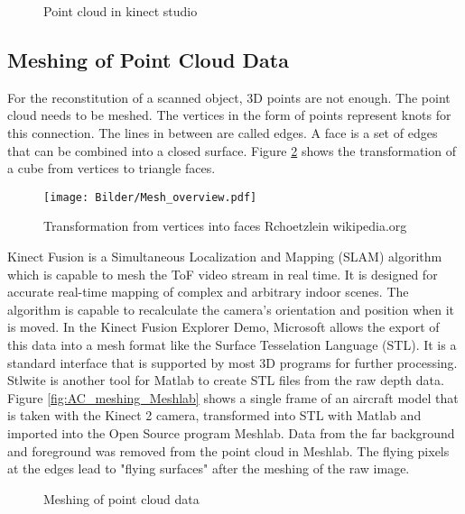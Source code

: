 \begin{figure}[!h]
	\centering
	\caption{Point cloud in kinect studio}
	\label{fig:pointcloud}
\end{figure}  


\newpage
\subsection{Meshing of Point Cloud Data}
For the reconstitution of a scanned object, 3D points are not enough. The point cloud needs to be meshed. The vertices in the form of points represent knots for this connection. The lines in between are called edges. A face is a set of edges that can be combined into a closed surface. Figure \ref{fig:Mesh_overview} shows the transformation of a cube from vertices to triangle faces. 

\begin{figure}[!h]
	\centering
	\texttt{[image: Bilder/Mesh\_overview.pdf]}
	\caption{Transformation from vertices into faces \tiny Rchoetzlein wikipedia.org \ccbysa}
	\label{fig:Mesh_overview}
\end{figure}

Kinect Fusion is a Simultaneous Localization and Mapping (SLAM) algorithm which is capable to mesh the ToF video stream in real time. It is designed for accurate real-time mapping of complex and arbitrary indoor scenes. The algorithm is capable to recalculate the camera's orientation and position when it is moved. In the Kinect Fusion Explorer Demo, Microsoft allows the export of this data into a mesh format like the Surface Tesselation Language (STL). It is a standard interface that is supported by most 3D programs for further processing. 
Stlwite is another tool for Matlab to create STL files from the raw depth data. Figure \ref{fig:AC_meshing_Meshlab} shows a single frame of an aircraft model that is taken with the Kinect 2 camera, transformed into STL with Matlab and imported into the Open Source program Meshlab. Data from the far background and foreground was removed from the point cloud in Meshlab. The flying pixels at the edges lead to "flying surfaces" after the meshing of the raw image. 

\begin{figure}[!h]
	\hfill
	\caption{Meshing of point cloud data}
\end{figure}

